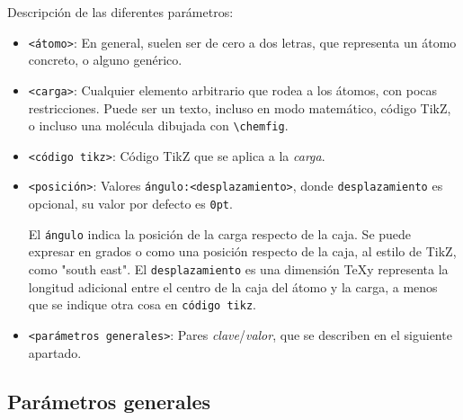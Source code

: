Descripción de las diferentes parámetros:
\begin{itemize}
\item \texttt{<átomo>}: En general, suelen ser de cero a dos letras, que representa un
  átomo concreto, o alguno genérico.

\item \texttt{<carga>}: Cualquier elemento arbitrario que rodea a los átomos, con pocas
  restricciones. Puede ser un texto, incluso en modo matemático, código \textsf{TikZ}, o
  incluso una molécula dibujada con \texttt{\textbackslash chemfig}.

\item \texttt{<código tikz>}: Código \textsf{TikZ} que se aplica a la \emph{carga}.

\item \texttt{<posición>}: Valores \texttt{ángulo:<desplazamiento>}, donde
  \texttt{desplazamiento} es opcional, su valor por defecto es \texttt{0pt}.

  El \texttt{ángulo} indica la posición de la carga respecto de la caja. Se puede
  expresar en grados o como una posición respecto de la caja, al estilo de \textsf{TikZ},
  como "south east". El \texttt{desplazamiento} es una dimensión \TeX y representa la
  longitud adicional entre el centro de la caja del átomo y la carga, a menos que
  se indique otra cosa en \texttt{código tikz}.
  
\item \texttt{<parámetros generales>}: Pares \emph{clave}/\emph{valor}, que se describen
  en el siguiente apartado.
\end{itemize}
  
\subsection{Parámetros generales}

